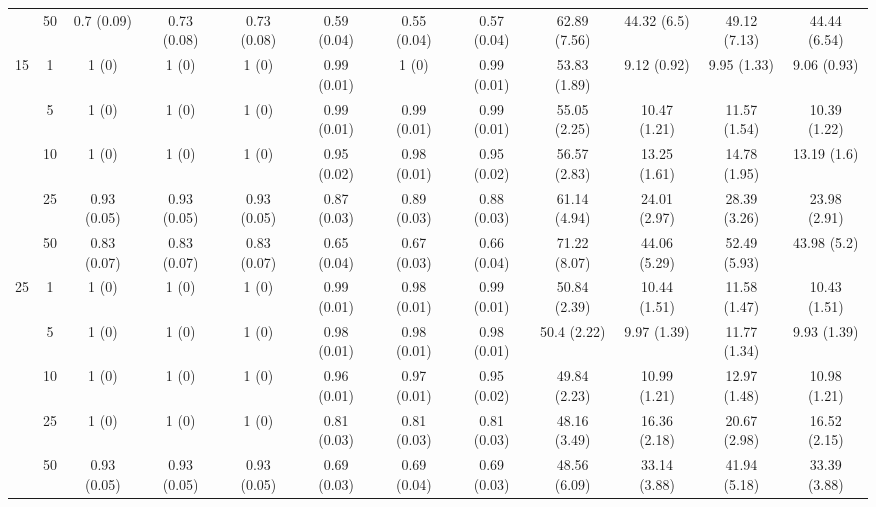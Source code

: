 \documentclass[11pt]{article}
\theoremstyle{definition}
\begin{document}
\begin{table}[H]
\begin{center}
{\begin{tabular}{cc|ccc|ccc|cccc|}
  & 50  & 0.7 (0.09) & 0.73 (0.08) & 0.73 (0.08) & 0.59 (0.04) & 0.55 (0.04) & 0.57 (0.04) & 62.89 (7.56) & 44.32 (6.5) & 49.12 (7.13) & 44.44 (6.54) \\[.3cm] 
 \multirow{5}{*}{15} & 1  & 1 (0) & 1 (0) & 1 (0) & 0.99 (0.01) & 1 (0) & 0.99 (0.01) & 53.83 (1.89) & 9.12 (0.92) & 9.95 (1.33) & 9.06 (0.93) \\ 
  & 5  & 1 (0) & 1 (0) & 1 (0) & 0.99 (0.01) & 0.99 (0.01) & 0.99 (0.01) & 55.05 (2.25) & 10.47 (1.21) & 11.57 (1.54) & 10.39 (1.22) \\ 
  & 10  & 1 (0) & 1 (0) & 1 (0) & 0.95 (0.02) & 0.98 (0.01) & 0.95 (0.02) & 56.57 (2.83) & 13.25 (1.61) & 14.78 (1.95) & 13.19 (1.6) \\ 
  & 25  & 0.93 (0.05) & 0.93 (0.05) & 0.93 (0.05) & 0.87 (0.03) & 0.89 (0.03) & 0.88 (0.03) & 61.14 (4.94) & 24.01 (2.97) & 28.39 (3.26) & 23.98 (2.91) \\ 
  & 50  & 0.83 (0.07) & 0.83 (0.07) & 0.83 (0.07) & 0.65 (0.04) & 0.67 (0.03) & 0.66 (0.04) & 71.22 (8.07) & 44.06 (5.29) & 52.49 (5.93) & 43.98 (5.2) \\[.3cm] 
 \multirow{5}{*}{25} & 1  & 1 (0) & 1 (0) & 1 (0) & 0.99 (0.01) & 0.98 (0.01) & 0.99 (0.01) & 50.84 (2.39) & 10.44 (1.51) & 11.58 (1.47) & 10.43 (1.51) \\ 
  & 5  & 1 (0) & 1 (0) & 1 (0) & 0.98 (0.01) & 0.98 (0.01) & 0.98 (0.01) & 50.4 (2.22) & 9.97 (1.39) & 11.77 (1.34) & 9.93 (1.39) \\ 
  & 10  & 1 (0) & 1 (0) & 1 (0) & 0.96 (0.01) & 0.97 (0.01) & 0.95 (0.02) & 49.84 (2.23) & 10.99 (1.21) & 12.97 (1.48) & 10.98 (1.21) \\ 
  & 25  & 1 (0) & 1 (0) & 1 (0) & 0.81 (0.03) & 0.81 (0.03) & 0.81 (0.03) & 48.16 (3.49) & 16.36 (2.18) & 20.67 (2.98) & 16.52 (2.15) \\ 
    & 50  & 0.93 (0.05) & 0.93 (0.05) & 0.93 (0.05) & 0.69 (0.03) & 0.69 (0.04) & 0.69 (0.03) & 48.56 (6.09) & 33.14 (3.88) & 41.94 (5.18) & 33.39 (3.88) \\
\end{tabular}}
   \end{center}
      \vspace{-.5cm}
\end{table}



\end{document}
